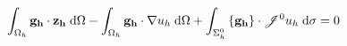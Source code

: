 \documentclass[11pt,a4paper]{article}
\begin{document}
\begin{dmath}
  \int_{\Omega_h} {\bf g_h} \cdot {\bf z_h} \; \text{d}\Omega - \int_{\Omega_h} {\bf g_h} \cdot \nabla u_h \; \text{d}\Omega + \int_{\Sigma^0_h} \left\{ {\bf g_h} \right\} \cdot \mathscr{J}^0 u_h \; \text{d}\sigma = 0
\end{dmath}

\end{document}
